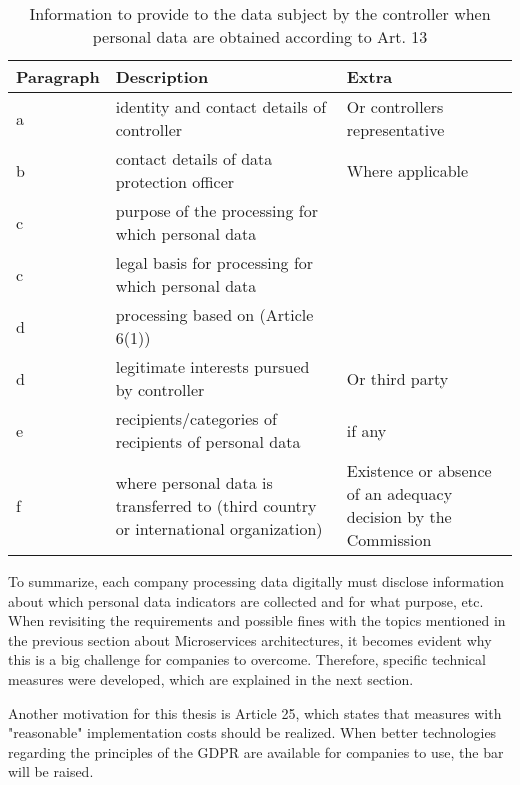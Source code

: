 \begin{table}[h]
    \centering
    \begin{tabularx}{\linewidth}{ lXX }
        \textbf{Paragraph} & \textbf{Description} & \textbf{Extra} \\
        \hline
        a & identity and contact details of controller & Or controllers representative \\
        \hline
        b & contact details of data protection officer & Where applicable  \\
        \hline
        c & purpose of the processing for which personal data & \\
        \hline
        c & legal basis for processing for which personal data & \\
        \hline
        d & processing based on (Article 6(1)) & \\
        \hline
        d & legitimate interests pursued by controller & Or third party \\
        \hline
        e & recipients/categories of recipients of personal data & if any \\
        \hline
        f & where personal data is transferred to (third country or international organization) & Existence or absence of an adequacy decision by the Commission \\
        \hline
    \end{tabularx}
    \caption{Information to provide to the data subject by the controller when personal data are obtained according to Art. 13 \cite{noauthor_review_nodate}}
    \label{tab:gdpr_art_13_1}
\end{table}
To summarize, each company processing data digitally must disclose information about which personal data indicators  are collected and for what purpose, etc. When revisiting the requirements and possible fines with the topics mentioned in the previous section about Microservices architectures, it becomes evident why this is a big challenge for companies to overcome. Therefore, specific technical measures were developed, which are explained in the next section.

Another motivation for this thesis is Article 25, which states that measures with "reasonable" implementation costs should be realized. When better technologies regarding the principles of the GDPR are available for companies to use, the bar will be raised.


